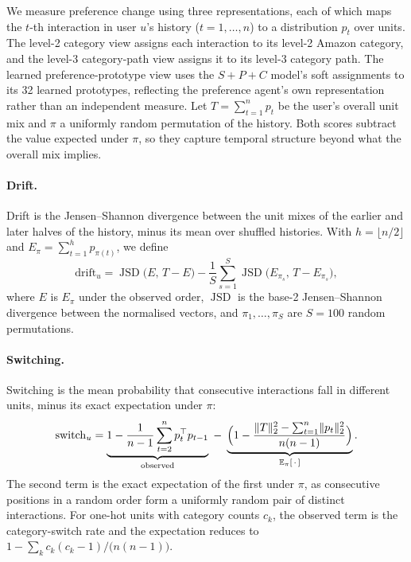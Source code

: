 ﻿\documentclass[sigconf,anonymous,review]{acmart}
\begin{document}
We measure preference change using three representations, each of which maps the $t$-th interaction in user $u$'s history ($t=1,\dots,n$) to a distribution $p_t$ over units. The level-2 category view assigns each interaction to its level-2 Amazon category, and the level-3 category-path view assigns it to its level-3 category path. The learned preference-prototype view uses the $S+P+C$ model's soft assignments to its 32 learned prototypes, reflecting the preference agent's own representation rather than an independent measure. Let $T=\sum_{t=1}^{n} p_t$ be the user's overall unit mix and $\pi$ a uniformly random permutation of the history. Both scores subtract the value expected under $\pi$, so they capture temporal structure beyond what the overall mix implies.

\paragraph{Drift.}
Drift is the Jensen--Shannon divergence between the unit mixes of the earlier and later halves of the history, minus its mean over shuffled histories. With
$h=\lfloor n/2 \rfloor$ and $E_\pi=\sum_{t=1}^{h} p_{\pi(t)}$, we define
\begin{equation}
  \mathrm{drift}_u
  = \operatorname{JSD}\bigl(E,\, T-E\bigr)
  - \frac{1}{S}\sum_{s=1}^{S}\operatorname{JSD}\bigl(E_{\pi_s},\, T-E_{\pi_s}\bigr),
  \label{eq:drift}
\end{equation}
where $E$ is $E_\pi$ under the observed order, $\operatorname{JSD}$ is the base-2 Jensen--Shannon divergence between the normalised vectors, and $\pi_1,\dots,\pi_S$ are $S=100$ random permutations.

\paragraph{Switching.}
Switching is the mean probability that consecutive interactions fall in different units, minus its exact expectation under $\pi$:
\begin{equation}
  \mathrm{switch}_u
  = \underbrace{1-\frac{1}{n-1}\sum_{t=2}^{n} p_t^{\top}p_{t-1}}_{\text{observed}}
  \;-\;
  \underbrace{\Bigl(1-\frac{\lVert T\rVert_2^{2}-\sum_{t=1}^{n}\lVert p_t\rVert_2^{2}}{n(n-1)}\Bigr)}_{\mathbb{E}_\pi[\,\cdot\,]}.
  \label{eq:switch}
\end{equation}
The second term is the exact expectation of the first under $\pi$, as consecutive positions in a random order form a uniformly random pair of distinct interactions. For one-hot units with category counts $c_k$, the observed term is the category-switch rate and the expectation reduces to $1-\sum_k c_k(c_k-1)/\bigl(n(n-1)\bigr)$.
\end{document}
